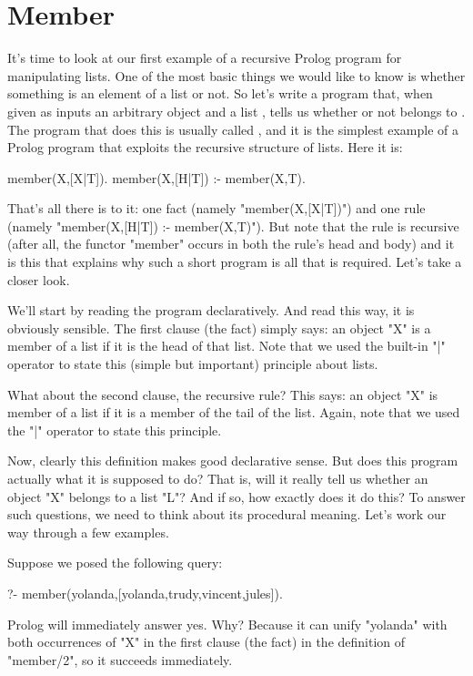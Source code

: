 \section{Member}\label{SEC.L4.MEMBER}

It's time to look at our first example of a recursive Prolog program
for manipulating lists.  One of the most basic things we would like to
know is whether something is an element of a list or not.  So let's
write a program that, when given as inputs an arbitrary object
 and a list , tells us whether or not
 belongs to .  The program that does this is
usually called , and it is the simplest example of a
Prolog program that exploits the recursive structure of lists.  Here
it is:


\begin{LPNcodedisplay}
member(X,[X|T]).
member(X,[H|T]) :- member(X,T).
\end{LPNcodedisplay}


That's all there is to it: one fact (namely "member(X,[X|T])")
and one rule (namely "member(X,[H|T]) :- member(X,T)"). But note
that the rule is recursive (after all, the functor "member"
occurs in both the rule's head and body) and it is this that explains
why such a short program is all that is required.
Let's take a closer look.

We'll start by reading the program declaratively. And read this way,
it is obviously sensible.  The first clause (the fact) simply says: an
object "X" is a member of a list if it is the head of that list.
Note that we used the built-in "|" operator to state this (simple
but important) principle about lists.

 What about the second clause, the recursive rule?  This says: an
object "X" is member of a list if it is a member of the tail of
the list.  Again, note that we used the "|" operator to state
this principle.

Now, clearly this definition makes good declarative sense.  But does
this program actually  what it is supposed to do?  That is,
will it really tell us whether an object "X" belongs to a list
"L"? And if so, how exactly does it do this?  To answer such
questions, we need to think about its procedural meaning.  Let's work
our way through a few examples.

Suppose we posed the following query:

\begin{LPNcodedisplay}
?- member(yolanda,[yolanda,trudy,vincent,jules]).
\end{LPNcodedisplay}
Prolog will immediately answer yes.  Why?  Because it can unify
"yolanda" with both occurrences of "X" in the first clause
(the fact) in the definition of "member/2", so it succeeds
immediately.

